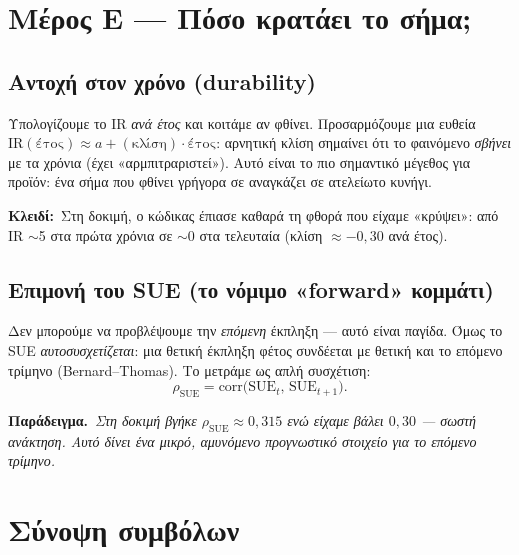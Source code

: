 \documentclass[11pt]{article}
\newcommand{\key}[1]{\par\medskip\noindent\colorbox{soft}{\parbox{\dimexpr\linewidth-2\fboxsep}{\textcolor{accent}{\textbf{Κλειδί:}}\ #1}}\par\medskip}
\newcommand{\ex}[1]{\par\smallskip\noindent\textbf{\textcolor{accent}{Παράδειγμα.}}\ \textit{#1}\par\smallskip}
\begin{document}
\section{Μέρος Ε — Πόσο κρατάει το σήμα;}

\subsection{Αντοχή στον χρόνο (durability)}
Υπολογίζουμε το IR \emph{ανά έτος} και κοιτάμε αν φθίνει. Προσαρμόζουμε μια ευθεία
$\mathrm{IR}(\text{έτος})\approx a+(\text{κλίση})\cdot\text{έτος}$: αρνητική κλίση σημαίνει ότι
το φαινόμενο \emph{σβήνει} με τα χρόνια (έχει «αρμπιτραριστεί»). Αυτό είναι το πιο σημαντικό
μέγεθος για προϊόν: ένα σήμα που φθίνει γρήγορα σε αναγκάζει σε ατελείωτο κυνήγι.

\key{Στη δοκιμή, ο κώδικας έπιασε καθαρά τη φθορά που είχαμε «κρύψει»: από IR $\sim$5 στα πρώτα
χρόνια σε $\sim$0 στα τελευταία (κλίση $\approx -0{,}30$ ανά έτος).}

\subsection{Επιμονή του SUE (το νόμιμο «forward» κομμάτι)}
Δεν μπορούμε να προβλέψουμε την \emph{επόμενη} έκπληξη — αυτό είναι παγίδα. Όμως το SUE
\emph{αυτοσυσχετίζεται}: μια θετική έκπληξη φέτος συνδέεται με θετική και το επόμενο τρίμηνο
(Bernard--Thomas). Το μετράμε ως απλή συσχέτιση:
\[ \rho_{\text{SUE}}=\mathrm{corr}\big(\mathrm{SUE}_{t},\,\mathrm{SUE}_{t+1}\big). \]
\ex{Στη δοκιμή βγήκε $\rho_{\text{SUE}}\approx0{,}315$ ενώ είχαμε βάλει $0{,}30$ — σωστή
ανάκτηση. Αυτό δίνει ένα μικρό, αμυνόμενο προγνωστικό στοιχείο για το επόμενο τρίμηνο.}

\section{Σύνοψη συμβόλων}
\end{document}
